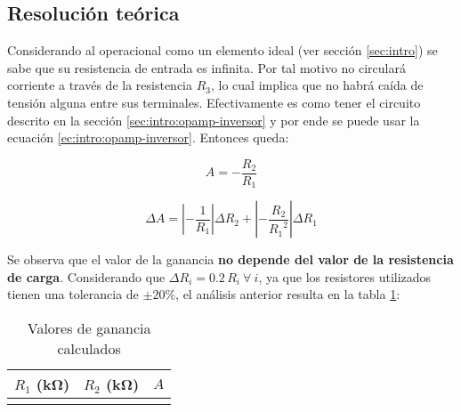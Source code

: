 \subsection{Resolución teórica}

Considerando al operacional como un elemento ideal (ver sección \ref{sec:intro}) se sabe que su resistencia de entrada es infinita. Por tal motivo no circulará corriente a través de la resistencia $R_3$, lo cual implica que no habrá caída de tensión alguna entre sus terminales. Efectivamente es como tener el circuito descrito en la sección \ref{sec:intro:opamp-inversor} y por ende se puede usar la ecuación \ref{ec:intro:opamp-inversor}. Entonces queda:

\begin{equation}
    \label{ec:1-teoria:ganancia}
    A = -\frac{R_2}{R_1}
\end{equation}

\begin{equation}
    \label{ec:1-teoria:err-ganancia}
    \Delta A = \left| - \frac{1}{R_1} \right| \Delta R_2
             + \left| - \frac{R_2}{{R_1}^2} \right| \Delta R_1
\end{equation}

Se observa que el valor de la ganancia \textbf{no depende del valor de la resistencia de carga}. Considerando que $\Delta R_i = 0.2\,R_i\ \forall\ i$, ya que los resistores utilizados tienen una tolerancia de $\pm 20\%$, el análisis anterior resulta en la tabla \ref{tab:1-teoria:valores}:

\begin{table}[H]
    \centering
    \begin{tabular}{@{}rrr@{}}
        \toprule
        $R_1$ (\si{\kilo\ohm}) & $R_2$ (\si{\kilo\ohm}) & $A$ \\
        \midrule
         \\ \bottomrule
    \end{tabular}
    \caption{Valores de ganancia calculados}
    \label{tab:1-teoria:valores}
\end{table}
